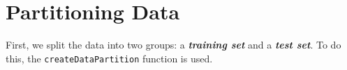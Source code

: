 

\section{Partitioning Data}
First, we split the data into two groups: a \textbf{\textit{training set}} and a \textbf{\textit{test set}}. 
To do this, the \texttt{createDataPartition}
function is used.



